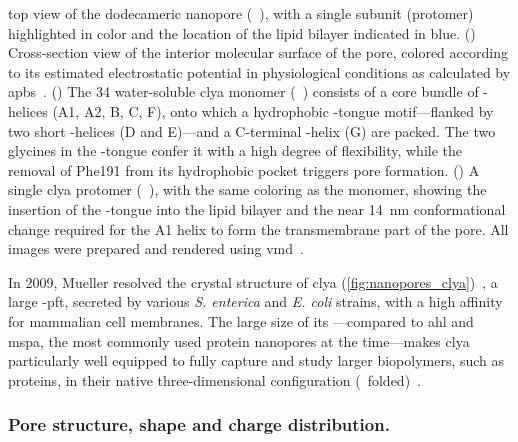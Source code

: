 \begin{figure*}[p]
{  %
  top view of the dodecameric  nanopore (~\cite{Peng-2019}), with a single
  subunit (protomer) highlighted in color and the location of the lipid bilayer indicated in blue.
  ()
  Cross-section view of the interior molecular surface of the pore, colored according to its estimated
  electrostatic potential in physiological conditions as calculated by
  \gls{apbs}~\cite{Baker-2001,Baker-2005}.
  ()
  The \SI{34}{\kDa} water-soluble \gls{clya} monomer (~\cite{Wallace-2000}) consists of a core
  bundle of \ta-helices (\ta A1, \ta A2, \ta B, \ta C, \ta F), onto which a hydrophobic \tb-tongue
  motif---flanked by two short \ta-helices (\ta D and \ta E)---and a C-terminal \ta-helix (\ta G) are packed.
  The two glycines in the \tb-tongue confer it with a high degree of flexibility, while the removal of Phe191
  from its hydrophobic pocket triggers pore formation.
  ()
  A single \gls{clya} protomer (~\cite{Peng-2019}), with the same coloring as the monomer, showing
  the insertion of the \ta-tongue into the lipid bilayer and the near \SI{14}{\nm} conformational change
  required for the \ta A1 helix to form the transmembrane part of the pore.
  All images were prepared and rendered using \gls{vmd}~\cite{Humphrey-1996,Stone-1998}.
  }\label{fig:nanopores_clya}
\end{figure*}

In 2009, Mueller \etal{} resolved the crystal structure of \gls{clya}
(\cref{fig:nanopores_clya})~\cite{Mueller-2009}, a large \ta-\gls{pft}, secreted by various \textit{S.
enterica} and \textit{E. coli} strains, with a high affinity for mammalian cell membranes. The large size of
its \lumen---compared to \gls{ahl} and \gls{mspa}, the most commonly used protein nanopores at the
time---makes \gls{clya} particularly well equipped to fully capture and study larger biopolymers, such as
proteins, in their native three-dimensional configuration
(\ie~folded)~\cite{Soskine-2013,Soskine-Biesemans-2015}.


\subsubsection{Pore structure, shape and charge distribution.}
%

